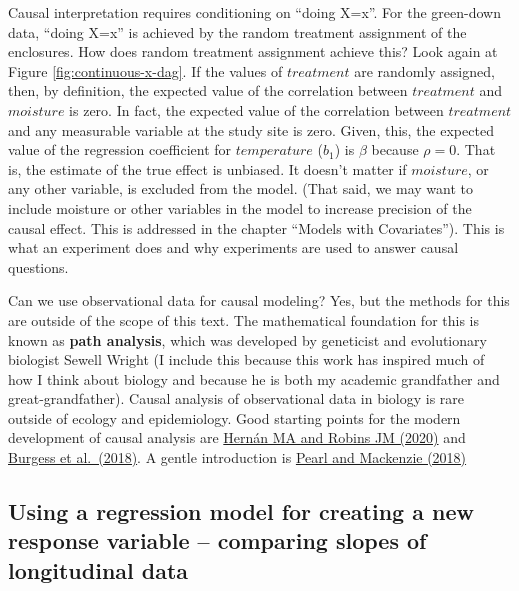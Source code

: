 \documentclass[]{book}
\begin{document}
Causal interpretation requires conditioning on ``doing X=x''. For the green-down data, ``doing X=x'' is achieved by the random treatment assignment of the enclosures. How does random treatment assignment achieve this? Look again at Figure \ref{fig:continuous-x-dag}. If the values of \(treatment\) are randomly assigned, then, by definition, the expected value of the correlation between \(treatment\) and \(moisture\) is zero. In fact, the expected value of the correlation between \(treatment\) and any measurable variable at the study site is zero. Given, this, the expected value of the regression coefficient for \(temperature\) (\(b_1\)) is \(\beta\) because \(\rho=0\). That is, the estimate of the true effect is unbiased. It doesn't matter if \(moisture\), or any other variable, is excluded from the model. (That said, we may want to include moisture or other variables in the model to increase precision of the causal effect. This is addressed in the chapter ``Models with Covariates''). This is what an experiment does and why experiments are used to answer causal questions.

Can we use observational data for causal modeling? Yes, but the methods for this are outside of the scope of this text. The mathematical foundation for this is known as \textbf{path analysis}, which was developed by geneticist and evolutionary biologist Sewell Wright (I include this because this work has inspired much of how I think about biology and because he is both my academic grandfather and great-grandfather). Causal analysis of observational data in biology is rare outside of ecology and epidemiology. Good starting points for the modern development of causal analysis are \href{https://www.hsph.harvard.edu/miguel-hernan/causal-inference-book/}{Hernán MA and Robins JM (2020)} and \href{https://www.annualreviews.org/doi/abs/10.1146/annurev-genom-083117-021731}{Burgess et al.~(2018)}. A gentle introduction is \href{https://www.basicbooks.com/titles/judea-pearl/the-book-of-why/9780465097609/}{Pearl and Mackenzie (2018)}

\hypertarget{using-a-regression-model-for-creating-a-new-response-variable-comparing-slopes-of-longitudinal-data}{%
\subsection{Using a regression model for creating a new response variable -- comparing slopes of longitudinal data}\label{using-a-regression-model-for-creating-a-new-response-variable-comparing-slopes-of-longitudinal-data}}
\end{document}
